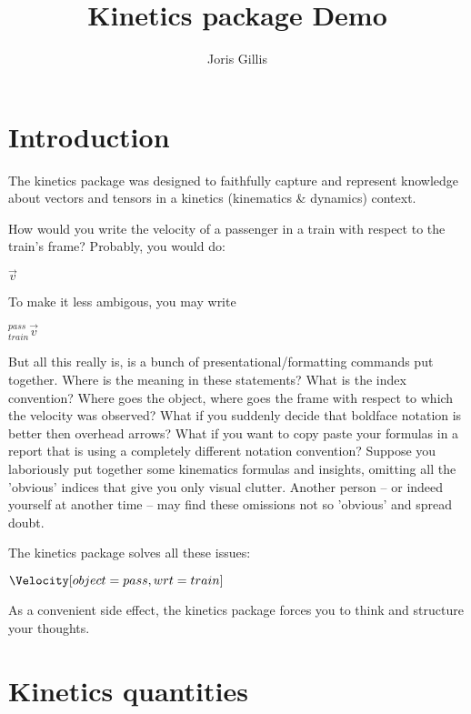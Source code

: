 \documentclass[10pt,a4paper]{article}
\title{Kinetics package Demo}
\author{Joris Gillis}
\begin{document}
\maketitle

\section{Introduction}

The kinetics package was designed to faithfully capture and represent knowledge about vectors and tensors in a kinetics (kinematics \& dynamics) context.

How would you write the velocity of a passenger in a train with respect to the train's frame?
Probably, you would do:

\begin{SideBySideExample}[xrightmargin=1cm,frame=single]
  $\vec{v}$
\end{SideBySideExample}

To make it less ambigous, you may write
\begin{SideBySideExample}[xrightmargin=1cm,frame=single]
  ${^{pass}_{train}}\vec{v}$
\end{SideBySideExample}

But all this really is, is a bunch of presentational/formatting commands put together. Where is the meaning in these statements?
What is the index convention? Where goes the object, where goes the frame with respect to which the velocity was observed? What if you suddenly decide that boldface notation is better then overhead arrows?
What if you want to copy paste your formulas in a report that is using a completely different notation convention? Suppose you laboriously put together some kinematics formulas and insights, omitting all the 'obvious' indices that give you only visual clutter.
Another person -- or indeed yourself at another time -- may find these omissions not so 'obvious' and spread doubt. 


The kinetics package solves all these issues:

\begin{SideBySideExample}[xrightmargin=1cm,frame=single]
  $\Velocity[object=pass,wrt=train]$
\end{SideBySideExample}

As a convenient side effect, the kinetics package forces you to think and structure your thoughts.

\section{Kinetics quantities}
\end{document}
